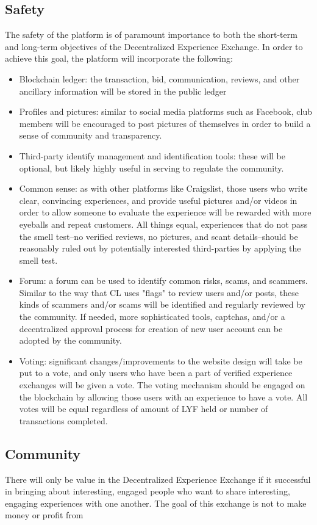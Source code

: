 \documentclass[11pt]{article}
\begin{document}
\subsection{Safety}
\label{sec-5-1}
The safety of the platform is of paramount importance to both the short-term and long-term objectives of the Decentralized Experience Exchange. In order to achieve this goal, the platform will incorporate the following:
\begin{itemize}
\item{Blockchain ledger: the transaction, bid, communication, reviews, and other ancillary information will be stored in the public ledger}
\item{Profiles and pictures: similar to social media platforms such as Facebook, club members will be encouraged to post pictures of themselves in order to build a sense of community and transparency. }
\item{Third-party identify management and identification tools: these will be optional, but likely highly useful in serving to regulate the community.}
\item{Common sense: as with other platforms like Craigslist, those users who write clear, convincing experiences, and provide useful pictures and/or videos in order to allow someone to evaluate the experience will be rewarded with more eyeballs and repeat customers. All things equal, experiences that do not pass the smell test--no verified reviews, no pictures, and scant details--should be reasonably ruled out by potentially interested third-parties by applying the smell test.}
\item{Forum: a forum can be used to identify common risks, scams, and scammers. Similar to the way that CL uses "flags" to review users and/or posts, these kinds of scammers and/or scams will be identified and regularly reviewed by the community. If needed, more sophisticated tools, captchas, and/or a decentralized approval process for creation of new user account can be adopted by the community.}
\item{Voting: significant changes/improvements to the website design will take be put to a vote, and only users who have been a part of verified experience exchanges will be given a vote. The voting mechanism should be engaged on the blockchain by allowing those users with an experience to have a vote. All votes will be equal regardless of amount of LYF held or number of transactions completed. }
\end{itemize}

\subsection{Community}
\label{sec-5-2}
There will only be value in the Decentralized Experience Exchange if it successful in bringing about interesting, engaged people who want to share interesting, engaging experiences with one another. The goal of this exchange is not to make money or profit from 
\end{document}
